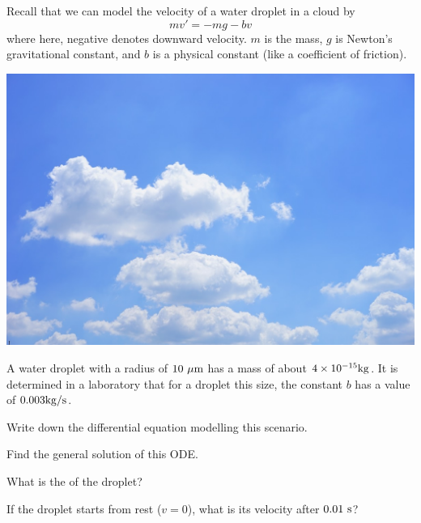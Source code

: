 

\begin{applicationActivities}



\begin{observation}
Recall that we can model the velocity of a water droplet in a cloud by
\[mv'=-mg-bv\]
where here, negative denotes downward velocity.  \(m\) is the mass, \(g\) is Newton's gravitational constant, and \(b\) is a physical constant (like a coefficient of friction).
\begin{center}
\includegraphics[scale=0.2]{media/cloud.jpg}
\end{center}
\end{observation}

\begin{activity}{25}
A water droplet with a radius of \(10\ {\rm \mu m}\) has a mass of about \(4 \times 10^{-15} {\rm kg}\).  It is determined in a laboratory that for a droplet this size, the constant \(b\) has a value of \(0.003 {\rm kg/s}\).
\begin{subactivity}
Write down the differential equation modelling this scenario.
\end{subactivity}
\begin{subactivity}
Find the general solution of this ODE.
\end{subactivity}
\begin{subactivity}
What is the  of the droplet?
\end{subactivity}
\begin{subactivity}If the droplet starts from rest (\(v=0\)), what is its velocity after \(0.01\ {\rm s}\)?
\end{subactivity}
\end{activity}


\end{applicationActivities}
